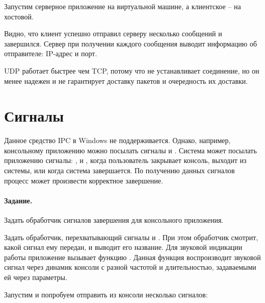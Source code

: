 



Запустим серверное приложение на виртуальной машине, а клиентское -- на хостовой.





Видно, что клиент успешно отправил серверу несколько сообщений и завершился. Сервер при получении каждого сообщения выводит информацию об отправителе: IP-адрес и порт.

UDP работает быстрее чем TCP, потому что не устанавливает соединение, но он менее надежен и не гарантирует доставку пакетов и очередность их доставки.

\section{Сигналы}

Данное средство IPC в Windows не поддерживается. Однако, например, консольному приложению можно посылать сигналы \caret{} и \caret{}. Система может посылать приложению сигналы: \caret{}, \caret{} и \caret{}, когда пользователь закрывает консоль, выходит из системы, или когда система завершается. По получению данных сигналов процесс может произвести корректное завершение.

\paragraph{Задание.} Задать обработчик сигналов завершения для консольного приложения.

Задать обработчик, перехватывающий сигналы \caret{} и \caret{}. При этом обработчик смотрит, какой сигнал ему передан, и выводит его название. Для звуковой индикации работы приложение вызывает функцию . Данная функция воспроизводит звуковой сигнал через динамик консоли с разной частотой и длительностью, задаваемыми ей через параметры.



Запустим  и попробуем отправить из консоли несколько сигналов:

